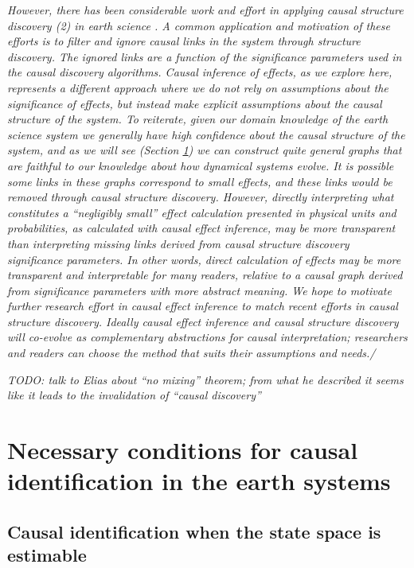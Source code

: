 \documentclass[12pt]{article}
\begin{document}
\textit{
  However, there has been considerable work and effort in applying
  causal structure discovery (2) in earth science
  \citep[e.g.,][]{ebert-uphoff2012,
    samarasinghe-casuality,runge-causal-timeseries,runge2019inferring}. A
  common application and motivation of these efforts is to filter and
  ignore causal links in the system through structure discovery. The
  ignored links are a function of the significance parameters used in
  the causal discovery algorithms. Causal inference of effects, as we
  explore here, represents a different approach where we do not rely on
  assumptions about the significance of effects, but instead make
  explicit assumptions about the causal structure of the system. To
  reiterate, given our domain knowledge of the earth science system we
  generally have high confidence about the causal structure of the
  system, and as we will see (Section \ref{sec:necess-cond-caus}) we can
  construct quite general graphs that are faithful to our knowledge
  about how dynamical systems evolve. It is possible some links in these
  graphs correspond to small effects, and these links would be removed
  through causal structure discovery. However, directly interpreting
  what constitutes a ``negligibly small'' effect calculation presented in
  physical units and probabilities, as calculated with causal effect
  inference, may be more transparent than interpreting missing links
  derived from causal structure discovery significance parameters. In
  other words, direct calculation of effects may be more transparent and
  interpretable for many readers, relative to a causal graph derived
  from significance parameters with more abstract meaning. We hope to
  motivate further research effort in causal effect inference to match
  recent efforts in causal structure discovery. Ideally causal effect
  inference and causal structure discovery will co-evolve as
  complementary abstractions for causal interpretation; researchers and
  readers can choose the method that suits their assumptions and
  needs./}

\textit{
  TODO: talk to Elias about ``no mixing'' theorem; from what he
  described it seems like it leads to the invalidation of ``causal
  discovery''
}
\section{Necessary conditions for causal identification in the earth
  systems}
\label{sec:necess-cond-caus}
\subsection{Causal identification when the state space is estimable}
\label{state-space}
\end{document}
